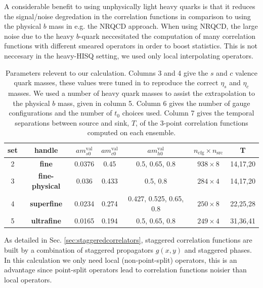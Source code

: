 A considerable benefit to using unphysically light heavy quarks is that it reduces the signal/noise degredation in the correlation functions in comparison to using the physical $b$ mass in e.g. the NRQCD approach. When using NRQCD, the large noise due to the heavy $b$-quark neccesitated the computation of many correlation functions with different smeared operators in order to boost statistics. This is not neccesary in the heavy-HISQ setting, we used only local interpolating operators.

\begin{table}
  \begin{center}
    \begin{tabular}{c c c c c c c}
      \hline
      set & handle & $am_{s0}^{\text{val}}$ & $am_{c0}^{\text{val}}$ & $am^{\text{val}}_{h0}$ & $n_{\text{cfg}}\times n_{\text{src}}$ & T \\ [0.5ex]
      \hline
      2 & \bf{fine} & 0.0376 & 0.45 
      & 0.5, 0.65, 0.8 & $938\times 8$ & 14,17,20 \\ [1ex]
      3 & \bf{fine-physical} & 0.036 & 0.433 
      & 0.5, 0.8 & $284\times 4$ & 14,17,20 \\ [1ex]
      4 & \bf{superfine} & 0.0234 & 
      0.274 & 0.427, 0.525, 0.65, 0.8 & $250\times 8$ & 22,25,28  \\ [1ex]
      5 & \bf{ultrafine} & 0.0165 
      & 0.194 & 0.5, 0.65, 0.8 & $249\times 4$ & 31,36,41\\ [1ex]
      \hline
    \end{tabular}
  \end{center}
  \caption{Parameters relevent to our calculation. Columns 3 and 4 give the $s$ and $c$ valence quark masses, these values were tuned in \cite{Chakraborty:2014aca} to reproduce the correct $\eta_s$ and $\eta_c$ masses. We used a number of heavy quark masses to assist the extrapolation to the physical $b$ mass, given in column 5. Column 6 gives the number of gauge configurations and the number of $t_0$ choices used. Column 7 gives the temporal separations between source and sink, $T$, of the 3-point correlation functions computed on each ensemble.}
  \label{tab:BsDsensembles}
\end{table}

As detailed in Sec. \ref{sec:staggeredcorrelators}, staggered correlation functions are built by a combination of staggered propagators $g(x,y)$ and staggered phases. In this calculation we only need local (non-point-split) operators, this is an advantage since point-split operators lead to correlation functions noisier than local operators. 

